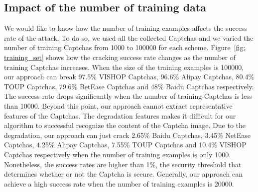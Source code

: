 \subsection{Impact of the number of training data}
We would like to know how the number of training examples affects the success rate of the attack. To do so, we used all the collected Captchas and we varied the number of training Captchas from 1000 to 100000 for each scheme. Figure~\ref{fig: training_set} shows how the cracking success rate changes as the number of training Captchas increases. When the size of the training examples is 100000, our approach can break 97.5\% VISHOP Captchas, 96.6\% Alipay Captchas, 80.4\% TOUP Captchas, 79.6\% BetEase Captchas and 48\% Baidu Captchas respectively. The success rate drops significantly when the number of training Captchas is less than 10000. Beyond this point, our approach cannot extract representative features of the Captchas. The degradation features makes it difficult for our algorithm to successful recognize the content of the Captcha image.
Due to the degradation, our approach can just crack 2.65\% Baidu Captchas, 3.45\% NetEase Captchas, 4.25\% Alipay Captchas, 7.55\% TOUP Captchas and 10.4\% VISHOP Captchas respectively when the number of training examples is only 1000. Nonetheless, the success rates are higher than 1\%, the security threshold that determines whether or not the Captcha is secure.
Generally, our approach can achieve a high success rate when the number of training examples is 20000.

